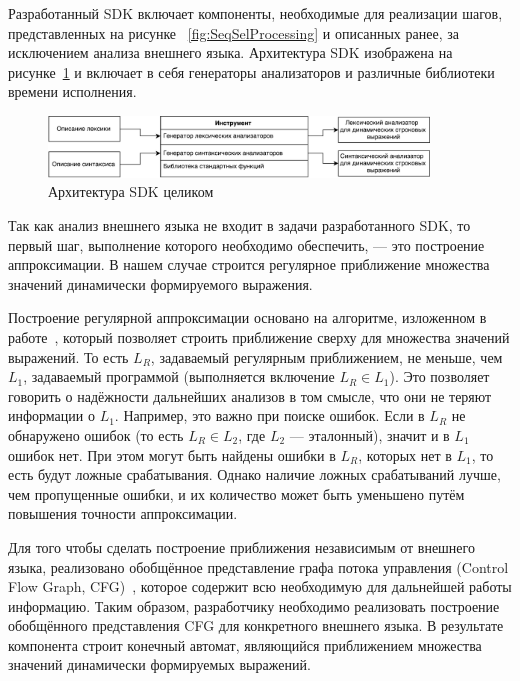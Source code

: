 Разработанный SDK включает компоненты, необходимые для реализации шагов, представленных на рисунке ~\ref{fig:SeqSelProcessing} и описанных ранее, за исключением анализа внешнего языка. Архитектура SDK изображена на рисунке~\ref{fig:SDKHLArch} и включает в себя генераторы анализаторов и различные библиотеки времени исполнения.

\begin{figure}[h!]
\begin{center}
\includegraphics[width=0.9\textwidth]{pics/HighLevelArch}
\caption{Архитектура SDK целиком}
\label{fig:SDKHLArch} 
\end{center}
\end{figure}

Так как анализ внешнего языка не входит в задачи разработанного SDK, то первый шаг, выполнение которого необходимо обеспечить, --- это построение аппроксимации. В нашем случае строится регулярное приближение множества значений динамически формируемого выражения.

Построение регулярной аппроксимации основано на алгоритме, изложенном в работе~\cite{RegOverApprox}, который позволяет строить приближение сверху для множества значений выражений. То есть $L_R$, задаваемый регулярным приближением, не меньше, чем $L_1$, задаваемый программой (выполняется включение $L_R \in L_1$). Это позволяет говорить о надёжности дальнейших анализов в том смысле, что они не теряют информации о $L_1$. Например, это важно при поиске ошибок. Если в $L_R$ не обнаружено ошибок (то есть $L_R \in L_2$, где $L_2$ --- эталонный), значит и в $L_1$ ошибок нет. При этом могут быть найдены ошибки в $L_R$, которых нет в $L_1$, то есть будут ложные срабатывания. Однако наличие ложных срабатываний лучше, чем пропущенные ошибки, и их количество может быть уменьшено путём повышения точности аппроксимации. 

Для того чтобы сделать построение приближения независимым от внешнего языка, реализовано обобщённое представление графа потока управления (Control Flow Graph, CFG)~\cite{Dragon}, которое содержит всю необходимую для дальнейшей работы информацию. Таким образом, разработчику необходимо реализовать построение обобщённого представления CFG для конкретного внешнего языка. В результате компонента строит конечный автомат, являющийся приближением множества значений динамически формируемых выражений.

